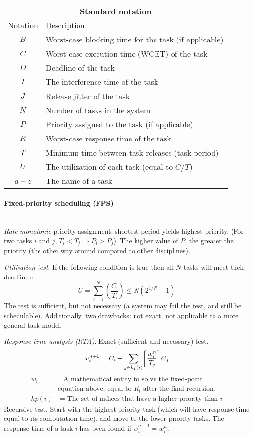 \hskip-0.5cm
\begin{tabularx}{\linewidth}{c X}
	\multicolumn{2}{c}{\textbf{Standard notation}} \\
	Notation & Description \\
	\hline
	$B$ & Worst-case blocking time for the task (if applicable)\\
  $C$ & Worst-case execution time (WCET) of the task\\
  $D$ & Deadline of the task\\
  $I$ & The interference time of the task\\
  $J$ & Release jitter of the task\\
  $N$ & Number of tasks in the system\\
  $P$ & Priority assigned to the task (if applicable)\\
  $R$ & Worst-case response time of the task\\
  $T$ & Minimum time between task releases (task period)\\
  $U$ & The utilization of each task (equal to $C/T$)\\
  $a$ -- $z$ & The name of a task
\end{tabularx}

\paragraph{Fixed-priority scheduling (FPS)} ~\\
\textit{Rate monotonic} priority assignment: shortest period yields highest priority. (For two tasks $i$ and $j$, $T_i < T_j \Rightarrow P_i > P_j$). The higher value of $P$, the greater the priority (the other way around compared to other disciplines).

\textit{Utilization test}. If the following condition is true then all $N$ tasks will meet their deadlines:
\begin{equation}
  U = \sum_{i=1}^N \left( \frac{C_i}{T_i} \right) \leq N\left( 2^{1/N} - 1 \right)
\end{equation}
The test is sufficient, but not necessary (a system may fail the test, and still be schedulable). Additionally, two drawbacks: not exact, not applicable to a more general task model.

\textit{Response time analysis (RTA)}. Exact (sufficient and necessary) test.
\begin{equation}
  w_i^{n+1} = C_i + \sum_{j \in hp(i)} \ceil*{\frac{w_i^n}{T_j}} C_j
\end{equation}
\begin{align*}
  w_i &= \text{A mathematical entity to solve the fixed-point}\\ &\text{equation above, equal to $R_i$ after the final recursion.}\\
  hp(i) &= \text{The set of indices that have a higher priority than $i$}
\end{align*}
Recursive test. Start with the highest-priority task (which will have response time equal to its computation time), and move to the lower priority tasks. The response time of a task $i$ has been found if $w_i^{n+1} = w_i^n$.

